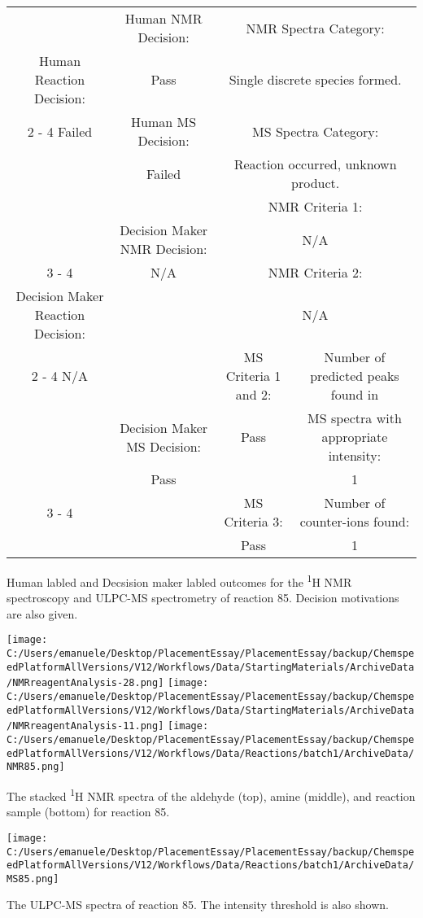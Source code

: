 \documentclass{article}%
\begin{document}
\begin{Decision Table}[H]%
\begin{tabular}{|c|c|c|c|}%
\hline%
&Human NMR Decision:&\multicolumn{2}{|c|}{NMR Spectra Category:}\\%
Human Reaction Decision:&Pass&\multicolumn{2}{|c|}{Single discrete species formed.}\\%
\cline{2%
-%
4}%
Failed&Human MS Decision:&\multicolumn{2}{|c|}{MS Spectra Category:}\\%
&Failed&\multicolumn{2}{|c|}{Reaction occurred, unknown product.}\\%
\hline%
&&\multicolumn{2}{|c|}{NMR Criteria 1:}\\%
&Decision Maker NMR Decision:&\multicolumn{2}{|c|}{N/A}\\%
\cline{3%
-%
4}%
&N/A&\multicolumn{2}{|c|}{NMR Criteria 2:}\\%
Decision Maker Reaction Decision:&&\multicolumn{2}{|c|}{N/A}\\%
\cline{2%
-%
4}%
N/A&&MS Criteria 1 and 2:&Number of predicted peaks found in\\%
&Decision Maker MS Decision:&Pass&MS spectra with appropriate intensity:\\%
&Pass&&1\\%
\cline{3%
-%
4}%
&&MS Criteria 3:&Number of counter{-}ions found:\\%
&&Pass&1\\%
\hline%
\end{tabular}%
\caption{Human labled and Decsision maker labled outcomes for the \textsuperscript{1}H NMR spectroscopy and ULPC-MS spectrometry of reaction 85. Decision motivations are also given.}%
\end{Decision Table}%
\begin{NMR Spectra}[H]%
\begin{center}%
\texttt{[image: C:/Users/emanuele/Desktop/PlacementEssay/PlacementEssay/backup/ChemspeedPlatformAllVersions/V12/Workflows/Data/StartingMaterials/ArchiveData/NMRreagentAnalysis-28.png]}\hfill%
\texttt{[image: C:/Users/emanuele/Desktop/PlacementEssay/PlacementEssay/backup/ChemspeedPlatformAllVersions/V12/Workflows/Data/StartingMaterials/ArchiveData/NMRreagentAnalysis-11.png]}\hfill%
\texttt{[image: C:/Users/emanuele/Desktop/PlacementEssay/PlacementEssay/backup/ChemspeedPlatformAllVersions/V12/Workflows/Data/Reactions/batch1/ArchiveData/NMR85.png]}\hfill%
\end{center}%
\caption{The stacked \textsuperscript{1}H NMR spectra of the aldehyde (top), amine (middle), and reaction sample (bottom) for reaction 85.}%
\end{NMR Spectra}%
\begin{MS Spectra}[H]%
\begin{center}%
\texttt{[image: C:/Users/emanuele/Desktop/PlacementEssay/PlacementEssay/backup/ChemspeedPlatformAllVersions/V12/Workflows/Data/Reactions/batch1/ArchiveData/MS85.png]}\hfill%
\end{center}%
\caption{The ULPC-MS spectra of reaction 85. The intensity threshold is also shown.}%
\end{MS Spectra}%
\end{document}
